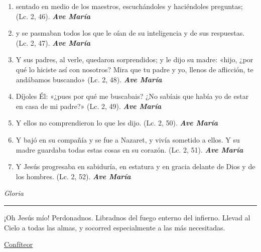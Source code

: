 \documentclass[a4paper,11pt, oneside]{report}
\begin{document}
{{\begin{enumerate}
      \item sentado en medio de los maestros, escuchándoles y haciéndoles preguntas; (Lc. 2, 46). \textbf{\textit{Ave María}}

      \item y se pasmaban todos los que le oían de su inteligencia y de sus respuestas. (Lc. 2, 47). \textbf{\textit{Ave María}}

      \item Y sus padres, al verle, quedaron sorprendidos; y le dijo su madre: «hijo, ¿por qué lo hiciste así con nosotros? Mira que tu padre
      y yo, llenos de aflicción, te andábamos buscando» (Lc. 2, 48). \textbf{\textit{Ave María}}

      \item Díjoles Él: «¿pues por qué me buscabais? ¿No sabíais que había yo de estar en casa de mi padre?» (Lc. 2, 49). \textbf{\textit{Ave María}}

      \item Y ellos no comprendieron lo que les dijo. (Lc. 2, 50). \textbf{\textit{Ave María}}

      \item Y bajó en su compañía y se fue a Nazaret, y vivía sometido a ellos. Y su madre guardaba todas estas
      cosas en su corazón. (Lc. 2, 51). \textbf{\textit{Ave María}}

      \item Y Jesús progresaba en sabiduría, en estatura y en gracia delante de Dios y de los hombres. (Lc. 2, 52). \textbf{\textit{Ave María}}

    \end{enumerate}
    \indent\textit{Gloria}

    \begin{center}\rule{1\linewidth}{\linethickness}\end{center}

    \medskip
    \hypertarget{finalPerdida}{¡Oh Jesús mío! Perdonadnos. Libradnos del fuego enterno del infierno. Llevad al Cielo a todas las almas, y socorred especialmente a las más 
    necesitadas.}
  }
  \par\bigskip
  \hyperlink{sec:confiteor}{Confíteor}
}
\end{document}
